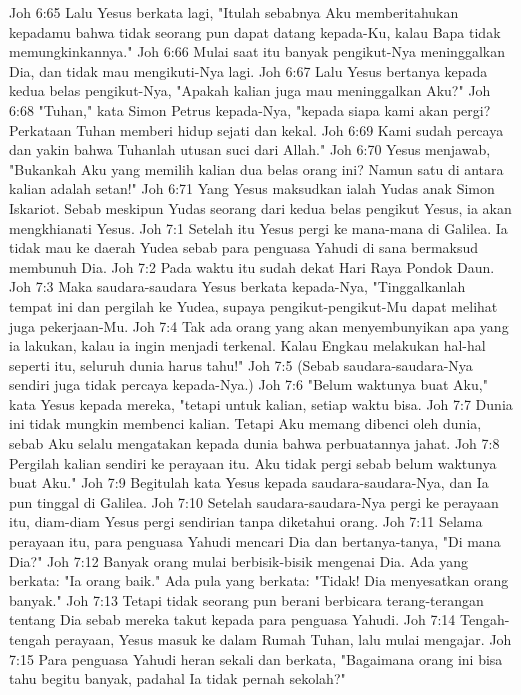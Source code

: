 Joh 6:65  Lalu Yesus berkata lagi, "Itulah sebabnya Aku memberitahukan kepadamu bahwa tidak seorang pun dapat datang kepada-Ku, kalau Bapa tidak memungkinkannya."
Joh 6:66  Mulai saat itu banyak pengikut-Nya meninggalkan Dia, dan tidak mau mengikuti-Nya lagi.
Joh 6:67  Lalu Yesus bertanya kepada kedua belas pengikut-Nya, "Apakah kalian juga mau meninggalkan Aku?"
Joh 6:68  "Tuhan," kata Simon Petrus kepada-Nya, "kepada siapa kami akan pergi? Perkataan Tuhan memberi hidup sejati dan kekal.
Joh 6:69  Kami sudah percaya dan yakin bahwa Tuhanlah utusan suci dari Allah."
Joh 6:70  Yesus menjawab, "Bukankah Aku yang memilih kalian dua belas orang ini? Namun satu di antara kalian adalah setan!"
Joh 6:71  Yang Yesus maksudkan ialah Yudas anak Simon Iskariot. Sebab meskipun Yudas seorang dari kedua belas pengikut Yesus, ia akan mengkhianati Yesus.
Joh 7:1  Setelah itu Yesus pergi ke mana-mana di Galilea. Ia tidak mau ke daerah Yudea sebab para penguasa Yahudi di sana bermaksud membunuh Dia.
Joh 7:2  Pada waktu itu sudah dekat Hari Raya Pondok Daun.
Joh 7:3  Maka saudara-saudara Yesus berkata kepada-Nya, "Tinggalkanlah tempat ini dan pergilah ke Yudea, supaya pengikut-pengikut-Mu dapat melihat juga pekerjaan-Mu.
Joh 7:4  Tak ada orang yang akan menyembunyikan apa yang ia lakukan, kalau ia ingin menjadi terkenal. Kalau Engkau melakukan hal-hal seperti itu, seluruh dunia harus tahu!"
Joh 7:5  (Sebab saudara-saudara-Nya sendiri juga tidak percaya kepada-Nya.)
Joh 7:6  "Belum waktunya buat Aku," kata Yesus kepada mereka, "tetapi untuk kalian, setiap waktu bisa.
Joh 7:7  Dunia ini tidak mungkin membenci kalian. Tetapi Aku memang dibenci oleh dunia, sebab Aku selalu mengatakan kepada dunia bahwa perbuatannya jahat.
Joh 7:8  Pergilah kalian sendiri ke perayaan itu. Aku tidak pergi sebab belum waktunya buat Aku."
Joh 7:9  Begitulah kata Yesus kepada saudara-saudara-Nya, dan Ia pun tinggal di Galilea.
Joh 7:10  Setelah saudara-saudara-Nya pergi ke perayaan itu, diam-diam Yesus pergi sendirian tanpa diketahui orang.
Joh 7:11  Selama perayaan itu, para penguasa Yahudi mencari Dia dan bertanya-tanya, "Di mana Dia?"
Joh 7:12  Banyak orang mulai berbisik-bisik mengenai Dia. Ada yang berkata: "Ia orang baik." Ada pula yang berkata: "Tidak! Dia menyesatkan orang banyak."
Joh 7:13  Tetapi tidak seorang pun berani berbicara terang-terangan tentang Dia sebab mereka takut kepada para penguasa Yahudi.
Joh 7:14  Tengah-tengah perayaan, Yesus masuk ke dalam Rumah Tuhan, lalu mulai mengajar.
Joh 7:15  Para penguasa Yahudi heran sekali dan berkata, "Bagaimana orang ini bisa tahu begitu banyak, padahal Ia tidak pernah sekolah?"
